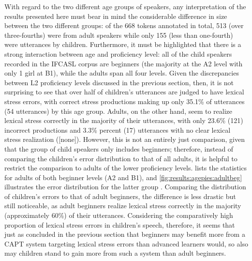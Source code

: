 			

				With regard to the two different age groups of speakers, any interpretation of the results presented here must bear in mind the considerable difference in size between the two different groups:  of the 668 tokens annotated in total, 513 (over three-fourths) were from adult speakers while only 155 (less than one-fourth) were utterances by children. Furthermore, it must be highlighted that there is a strong interaction between age and proficiency level: all of the child speakers recorded in the IFCASL corpus are beginners 
				(the majority at the A2 level with only 1 girl at B1),
				while the adults span all four levels. Given the discrepancies between L2 proficiency levels discussed in the previous section, then, it is not surprising to see that over half of children's utterances are judged to have lexical stress errors, with correct stress productions making up only 35.1\% of utterances (54 utterances) by this age group. Adults, on the other hand, seem to realize lexical stress correctly in the majority of their utterances, with only 23.6\% (121) incorrect productions and 3.3\% percent (17) utterances with no clear lexical stress realization ([none]). However, this is not an entirely just comparison, given that the group of child speakers only includes beginners; therefore, instead of comparing the children's error distribution to that of all adults, it is helpful to restrict the comparison to adults of the lower proficiency levels. 
				 lists the statistics for 
				adults of both beginner levels (A2 and B1), 
				and \cref{fig:results:agepies:adultbeg} illustrates the error distribution for the latter group . 
				Comparing the distribution of children's errors to that of adult beginners, the difference is less drastic but still noticeable, as adult beginners realize lexical stress correctly in the majority (approximately 60\%) of their utterances. Considering the comparatively high proportion of lexical stress errors in children's speech, therefore, it seems that just as  concluded in the previous section that beginners may benefit more from a CAPT system targeting lexical stress errors than advanced learners would, so also may children stand to gain more from such a system than adult beginners. 
				
